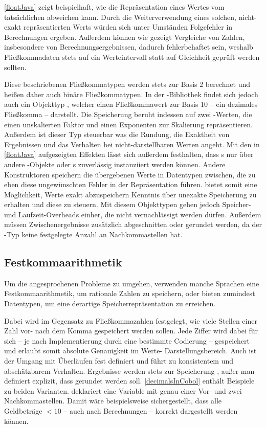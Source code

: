 \autoref{floatJava} zeigt beispielhaft, wie die Repräsentation eines Wertes vom tatsächlichen abweichen kann. Durch die Weiterverwendung eines solchen, nicht-exakt repräsentierten Werts würden sich unter Umständen Folgefehler in Berechnungen ergeben. Außerdem können wie gezeigt Vergleiche von Zahlen, insbesondere von Berechnungsergebnissen, dadurch fehlerbehaftet sein, weshalb Fließkommadaten stets auf ein Werteintervall statt auf Gleichheit geprüft werden sollten.

Diese beschriebenen Fließkommatypen werden stets zur Basis 2 berechnet und heißen daher auch binäre Fließkommatypen. In der -Bibliothek findet sich jedoch auch ein Objekttyp , welcher einen Fließkommawert zur Basis 10 -- ein dezimales Fließkomma -- darstellt. Die Speicherung beruht in­des­sen auf zwei -Werten, die einen unskalierten Faktor und einen Exponenten zur Skalierung repräsentieren. Außerdem ist dieser Typ steuerbar was die Rundung, die Exaktheit von Ergebnissen und das Verhalten bei nicht-darstellbaren Werten angeht. Mit den in \autoref{floatJava} aufgezeigten Effekten lässt sich außerdem festhalten, dass s nur über andere -Objekte oder s zuverlässig instanziiert werden können. Andere Konstruktoren speichern die übergebenen Werte in Datentypen zwischen, die zu eben diese ungewünschten Fehler in der Repräsentation führen.  bietet somit eine Möglichkeit, Werte exakt abzuspeichern \bzw Kenntnis über unexakte Speicherung zu erhalten und diese zu steuern. Mit diesem Objekttypen gehen jedoch Speicher- und Laufzeit-Overheads einher, die nicht vernachlässigt werden dürfen. Außerdem müssen Zwischenergebnisse \idR zusätzlich abgeschnitten oder gerundet werden, da der -Typ keine festgelegte Anzahl an Nachkommastellen hat.

\subsection*{Festkommaarithmetik}
Um die angesprochenen Probleme zu umgehen, verwenden manche Sprachen eine Festkommaarithmetik, um rationale Zahlen zu speichern, oder bieten zumindest Datentypen, um eine derartige Speicherrepräsentation zu erreichen. 

Dabei wird im Gegensatz zu Fließkommazahlen festgelegt, wie viele Stellen einer Zahl vor- \bzw nach dem Komma gespeichert werden sollen. Jede Ziffer wird dabei für sich -- je nach Implementierung durch eine bestimmte Codierung -- gespeichert und erlaubt somit absolute Genauigkeit im Werte- \bzw Darstellungsbereich. Auch ist der Umgang mit Überläufen fest definiert und führt zu konsistentem und abschätzbarem Verhalten. Ergebnisse werden stets zur Speicherung , außer man definiert explizit, dass gerundet werden soll. \autoref{decimalsInCobol} enthält Beispiele zu beiden Varianten.  deklariert eine Variable mit genau einer Vor- und zwei Nachkommastellen. Damit wäre beispielsweise sichergestellt, dass alle Geldbeträge $<10$ -- auch nach Berechnungen -- korrekt dargestellt werden können.


